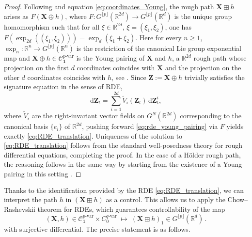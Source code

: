 \documentclass[12pt,a4paper]{article}
\numberwithin{equation}{section}
\def\bR{\mathbb{R}}\def\bS{\mathbb{S}}
\theoremstyle{plain}
\theoremstyle{definition}
\theoremstyle{remark}
\begin{document}
\begin{proof}
Following \cite[Theorem 9.33]{frizbook} and equation \eqref{eq:coordinates_Young}, the rough path $\mathbf{X} \boxplus h$ arises as $F(\mathbf{X} \oplus h)$, where $F\colon G^{\lfloor p \rfloor}(\mathbb{R}^{2d})\to G^{\lfloor p \rfloor}(\bR^d)$ is the unique group homomorphism such that for all $\xi\in \mathbb{R}^{2d}$, $\xi=(\xi_1,\xi_2)$, one has $F(\exp_{2d}((\xi_1,\xi_2)))=\exp_d(\xi_1+\xi_2)$. Here for every $n\geq 1$,  $ \exp_n\colon  \mathbb{R}^n\to G^{\lfloor p \rfloor}(\mathbb{R}^{n})$ is the restriction of the canonical Lie group exponential map and $\mathbf{X} \oplus h\in \mathcal{C}^{p\text{-var}}_{\mathbf{1}}$ is the Young pairing of $\mathbf{X}$ and $h$, a $\mathbb{R}^{2d}$ rough path whose projection on the first $d$ coordinates coincides with $\mathbf{X}$ and the projection on the other $d$ coordinates coincides with $h$, see \cite[Theorem 9.26]{frizbook}. Since $\mathbf{Z}:=\mathbf{X} \oplus h$ trivially satisfies the signature equation in the sense of RDE,
\begin{equation}\label{eq:rde_young_pairing}
\mathrm{d}\mathbf{Z}_t = \sum_{i=1}^{2d} \widetilde{V}_i(\mathbf{Z}_t)\, \mathrm{d}\mathbf{Z}_t^i,
\end{equation}
where $\widetilde{V}_i$ are the right-invariant vector fields on $G^N(\mathbb{R}^{2d})$ corresponding to the canonical basis $\{e_i\}$ of $\mathbb{R}^{2d}$, pushing forward \eqref{eq:rde_young_pairing} via $F$ yields exactly \eqref{eq:RDE_translation}. Uniqueness of the solution to \eqref{eq:RDE_translation} follows from the standard well‑posedness theory for rough differential equations, completing the proof. In the case of a H\"older rough path, the reasoning follows in the same way by starting from  the existence of a Young pairing in this setting \cite[Lemma 9.24,Theorem 9.26]{frizbook}.
\end{proof}

Thanks to the identification provided by the RDE \eqref{eq:RDE_translation}, we can interpret the path \( h \) in \( (\mathbf{X} \boxplus h) \) as a control. This allows us to apply the Chow--Rashevskii theorem for RDEs, which guarantees controllability of the map
\[
(\mathbf{X}, h) \in \mathcal{C}^{p\text{-var}}_{\mathbf{1}} \times C^{q\text{-var}}_0 \;\longmapsto\; (\mathbf{X} \boxplus h)_1 \in G^{\lfloor p \rfloor}(\mathbb{R}^d)\,.
\]
with surjective differential. The precise statement is as follows.
\end{document}
